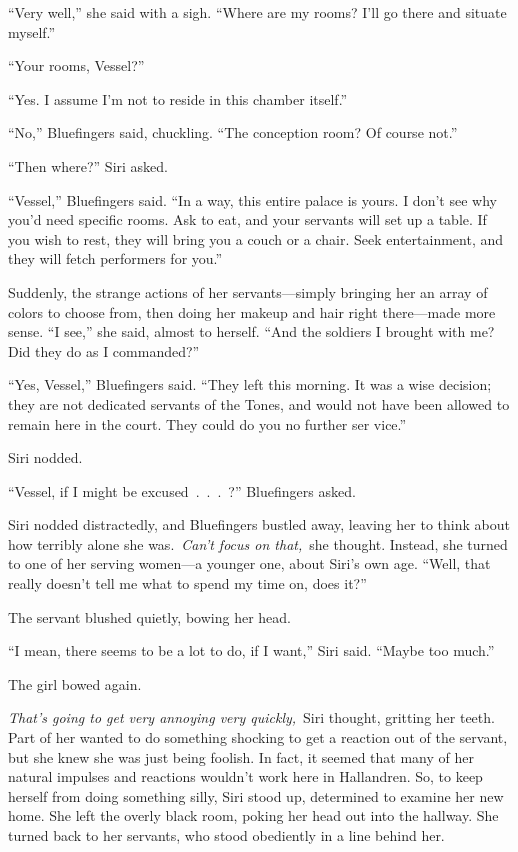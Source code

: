 “Very well,” she said with a sigh. “Where are my rooms? I’ll go there and situate myself.”

“Your rooms, Vessel?”

“Yes. I assume I’m not to reside in this chamber itself.”

“No,” Bluefingers said, chuckling. “The conception room? Of course not.”

“Then where?” Siri asked.

“Vessel,” Bluefingers said. “In a way, this entire palace is yours. I don’t see why you’d need specific rooms. Ask to eat, and your servants will set up a table. If you wish to rest, they will bring you a couch or a chair. Seek entertainment, and they will fetch performers for you.”

Suddenly, the strange actions of her servants—simply bringing her an array of colors to choose from, then doing her makeup and hair right there—made more sense. “I see,” she said, almost to herself. “And the soldiers I brought with me? Did they do as I commanded?”

“Yes, Vessel,” Bluefingers said. “They left this morning. It was a wise decision; they are not dedicated servants of the Tones, and would not have been allowed to remain here in the court. They could do you no further ser vice.”

Siri nodded.

“Vessel, if I might be excused~.~.~.~?” Bluefingers asked.

Siri nodded distractedly, and Bluefingers bustled away, leaving her to think about how terribly alone she was.~\textit{Can’t focus on that,}~she thought. Instead, she turned to one of her serving women—a younger one, about Siri’s own age. “Well, that really doesn’t tell me what to spend my time on, does it?”

The servant blushed quietly, bowing her head.

“I mean, there seems to be a lot to do, if I want,” Siri said. “Maybe too much.”

The girl bowed again.

\textit{That’s going to get very annoying very quickly,}~Siri thought, gritting her teeth. Part of her wanted to do something shocking to get a reaction out of the servant, but she knew she was just being foolish. In fact, it seemed that many of her natural impulses and reactions wouldn’t work here in Hallandren. So, to keep herself from doing something silly, Siri stood up, determined to examine her new home. She left the overly black room, poking her head out into the hallway. She turned back to her servants, who stood obediently in a line behind her.

